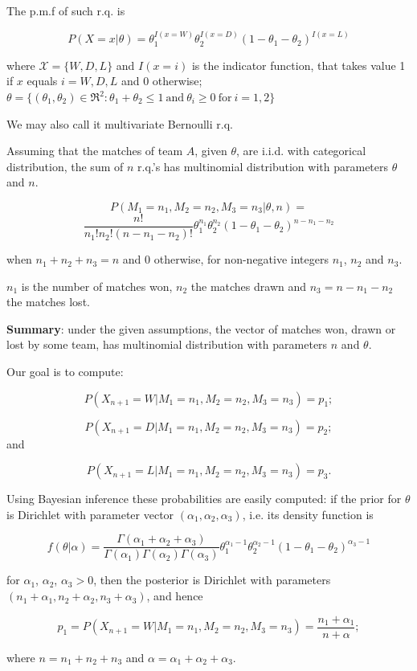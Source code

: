 \documentclass[journal,article,accept,moreauthors,pdftex,12pt,a4paper]{mdpi}
\begin{document}
The p.m.f of such r.q. is

\[
P(X=x|\theta)=\theta_1^{I(x=W)}\theta_2^{I(x=D)}(1-\theta_1-\theta_2)^{I(x=L)}
\]

\noindent
where $\mathcal{X}=\{W,D,L\}$ and $I(x=i)$ is the indicator function, that takes value 1 if $x$ equals $i= W, D, L$ and 0 otherwise; $\theta=\{(\theta_1,\theta_2)\in\Re^2:\theta_1+\theta_2\leq1 ~ \text{and} ~ \theta_i\geq0 ~ \text{for} ~ i=1, 2\}$

We may also call it multivariate Bernoulli r.q.

Assuming that the matches of team $A$, given $\theta$, are i.i.d. with categorical distribution, the sum of $n$ r.q.'s has multinomial distribution with parameters $\theta$ and $n$.

\[
P(M_1=n_1,M_2=n_2,M_3=n_3|\theta,n)=\]
\[
\frac{n!}{n_1!n_2!(n-n_1-n_2)!}\theta_1^{n_1}\theta_2^{n_2}(1-\theta_1-\theta_2)^{n-n_1-n_2}
\]

when $n_1+n_2+n_3=n$ and 0 otherwise, for non-negative integers $n_1$, $n_2$ and $n_3$.

$n_1$ is the number of matches won, $n_2$ the matches drawn and $n_3=n-n_1-n_2$ the matches lost.

{\bf Summary}: under the given assumptions, the vector of matches won, drawn or lost by some team, has multinomial distribution with parameters $n$ and $\theta$.

Our goal is to compute: 

\[P(X_{n+1}=W|M_1=n_1,M_2=n_2,M_3=n_3)=p_1;\]

\[P(X_{n+1}=D|M_1=n_1,M_2=n_2,M_3=n_3)=p_2;\] and

\[P(X_{n+1}=L|M_1=n_1,M_2=n_2,M_3=n_3)=p_3.\]


Using Bayesian inference these probabilities are easily computed: if the prior for $\theta$ is Dirichlet with parameter vector $(\alpha_1,\alpha_2,\alpha_3)$, i.e. its density function is

\[
f(\theta|\alpha)=\frac{\Gamma(\alpha_1+\alpha_2+\alpha_3)}{\Gamma(\alpha_1)\Gamma(\alpha_2)\Gamma(\alpha_3)}\theta_1^{\alpha_1-1}\theta_2^{\alpha_2-1}(1-\theta_1-\theta_2)^{\alpha_3-1}
\]

\noindent
for $\alpha_1$, $\alpha_2$, $\alpha_3 > 0$, then the posterior is Dirichlet with parameters $(n_1+\alpha_1,n_2+\alpha_2,n_3+\alpha_3)$, and hence

\[p_1=P(X_{n+1}=W|M_1=n_1,M_2=n_2,M_3=n_3)=\frac{n_1+\alpha_1}{n+\alpha};\]

\noindent
where $n=n_1+n_2+n_3$ and $\alpha=\alpha_1+\alpha_2+\alpha_3$.
\end{document}
